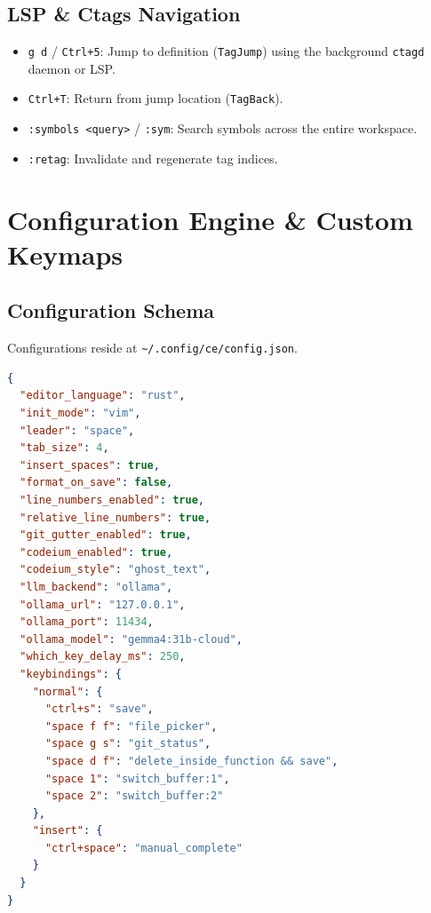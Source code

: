 \documentclass[11pt,a4paper,openany]{book}
\newcommand{\code}[1]{\colorbox{inlinebg}{\texttt{#1}}}
\begin{document}
\section{LSP \& Ctags Navigation}
\begin{itemize}[noitemsep]
    \item \code{g d} / \code{Ctrl+5}: Jump to definition (\code{TagJump}) using the background \texttt{ctagd} daemon or LSP.
    \item \code{Ctrl+T}: Return from jump location (\code{TagBack}).
    \item \code{:symbols <query>} / \code{:sym}: Search symbols across the entire workspace.
    \item \code{:retag}: Invalidate and regenerate tag indices.
\end{itemize}

\chapter{Configuration Engine \& Custom Keymaps}

\section{Configuration Schema}
Configurations reside at \code{\textasciitilde{}/.config/ce/config.json}.

\begin{lstlisting}[language=json]
{
  "editor_language": "rust",
  "init_mode": "vim",
  "leader": "space",
  "tab_size": 4,
  "insert_spaces": true,
  "format_on_save": false,
  "line_numbers_enabled": true,
  "relative_line_numbers": true,
  "git_gutter_enabled": true,
  "codeium_enabled": true,
  "codeium_style": "ghost_text",
  "llm_backend": "ollama",
  "ollama_url": "127.0.0.1",
  "ollama_port": 11434,
  "ollama_model": "gemma4:31b-cloud",
  "which_key_delay_ms": 250,
  "keybindings": {
    "normal": {
      "ctrl+s": "save",
      "space f f": "file_picker",
      "space g s": "git_status",
      "space d f": "delete_inside_function && save",
      "space 1": "switch_buffer:1",
      "space 2": "switch_buffer:2"
    },
    "insert": {
      "ctrl+space": "manual_complete"
    }
  }
}
\end{lstlisting}
\end{document}
